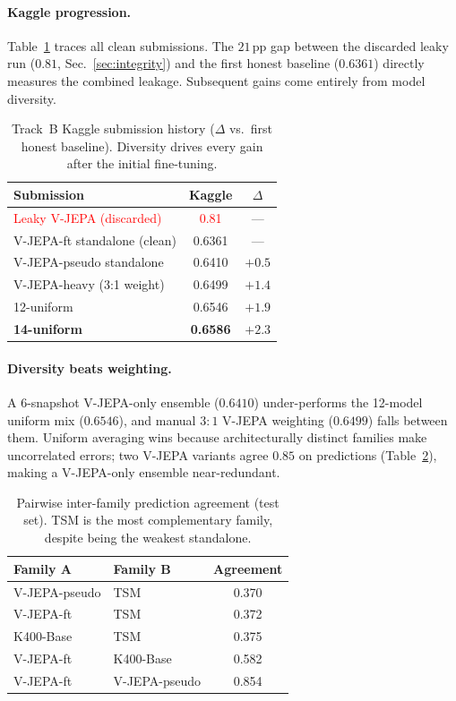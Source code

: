 \documentclass[10pt,twocolumn,letterpaper]{article}
\begin{document}
\paragraph{Kaggle progression.}
Table~\ref{tab:kaggle} traces all clean submissions. The $21$\,pp gap between the
discarded leaky run ($0.81$, Sec.~\ref{sec:integrity}) and the first honest
baseline ($0.6361$) directly measures the combined leakage. Subsequent gains
come entirely from model diversity.

\begin{table}[t]
\centering\small
\setlength{\tabcolsep}{5pt}
\begin{tabular}{@{}lcc@{}}
\toprule
Submission & Kaggle & $\Delta$ \\
\midrule
\textcolor{red}{Leaky V-JEPA (discarded)} & \textcolor{red}{0.81} & --- \\
V-JEPA-ft standalone (clean)   & 0.6361 & --- \\
V-JEPA-pseudo standalone       & 0.6410 & $+0.5$ \\
V-JEPA-heavy (3:1 weight)      & 0.6499 & $+1.4$ \\
12-uniform                     & 0.6546 & $+1.9$ \\
\textbf{14-uniform}            & \textbf{0.6586} & $+2.3$ \\
\bottomrule
\end{tabular}
\caption{Track~B Kaggle submission history ($\Delta$ vs.\ first honest baseline).
Diversity drives every gain after the initial fine-tuning.}
\label{tab:kaggle}
\end{table}

\paragraph{Diversity beats weighting.}
A 6-snapshot V-JEPA-only ensemble ($0.6410$) under-performs the 12-model uniform
mix ($0.6546$), and manual $3{:}1$ V-JEPA weighting ($0.6499$) falls between them.
Uniform averaging wins because architecturally distinct families make uncorrelated
errors; two V-JEPA variants agree $0.85$ on predictions (Table~\ref{tab:agree}),
making a V-JEPA-only ensemble near-redundant.

\begin{table}[t]
\centering\small
\setlength{\tabcolsep}{5pt}
\begin{tabular}{@{}llc@{}}
\toprule
Family A & Family B & Agreement \\
\midrule
V-JEPA-pseudo & TSM            & 0.370 \\
V-JEPA-ft     & TSM            & 0.372 \\
K400-Base     & TSM            & 0.375 \\
V-JEPA-ft     & K400-Base      & 0.582 \\
V-JEPA-ft     & V-JEPA-pseudo  & 0.854 \\
\bottomrule
\end{tabular}
\caption{Pairwise inter-family prediction agreement (test set). TSM is the most
complementary family, despite being the weakest standalone.}
\label{tab:agree}
\end{table}
\end{document}
